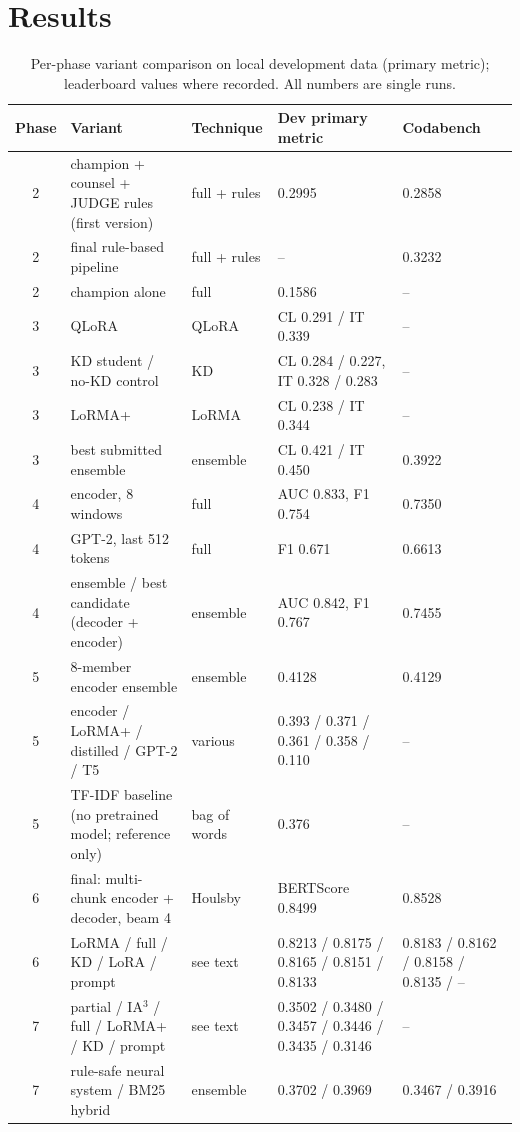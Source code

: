 \documentclass[10pt,a4paper]{article}
\begin{document}
\section{Results}
\begin{table}[h]\centering\footnotesize
\caption{Per-phase variant comparison on local development data (primary metric); leaderboard values where recorded. All numbers are single runs.}\label{tab:results}
\begin{tabular}{@{}cllll@{}}
\toprule
Phase & Variant & Technique & Dev primary metric & Codabench\\\midrule
2 & champion + counsel + JUDGE rules (first version) & full + rules & 0.2995 & 0.2858\\
2 & final rule-based pipeline & full + rules & -- & 0.3232\\
2 & champion alone & full & 0.1586 & --\\
3 & QLoRA & QLoRA & CL 0.291 / IT 0.339 & --\\
3 & KD student / no-KD control & KD & CL 0.284 / 0.227, IT 0.328 / 0.283 & --\\
3 & LoRMA+ & LoRMA & CL 0.238 / IT 0.344 & --\\
3 & best submitted ensemble & ensemble & CL 0.421 / IT 0.450 & 0.3922\\
4 & encoder, 8 windows & full & AUC 0.833, F1 0.754 & 0.7350\\
4 & GPT-2, last 512 tokens & full & F1 0.671 & 0.6613\\
4 & ensemble / best candidate (decoder + encoder) & ensemble & AUC 0.842, F1 0.767 & 0.7455\\
5 & 8-member encoder ensemble & ensemble & 0.4128 & 0.4129\\
5 & encoder / LoRMA+ / distilled / GPT-2 / T5 & various & 0.393 / 0.371 / 0.361 / 0.358 / 0.110 & --\\
5 & TF-IDF baseline (no pretrained model; reference only) & bag of words & 0.376 & --\\
6 & final: multi-chunk encoder + decoder, beam 4 & Houlsby & BERTScore 0.8499 & 0.8528\\
6 & LoRMA / full / KD / LoRA / prompt & see text & 0.8213 / 0.8175 / 0.8165 / 0.8151 / 0.8133 & 0.8183 / 0.8162 / 0.8158 / 0.8135 / --\\
7 & partial / IA$^3$ / full / LoRMA+ / KD / prompt & see text & 0.3502 / 0.3480 / 0.3457 / 0.3446 / 0.3435 / 0.3146 & --\\
7 & rule-safe neural system / BM25 hybrid & ensemble & 0.3702 / 0.3969 & 0.3467 / 0.3916\\\bottomrule
\end{tabular}
\end{table}
\end{document}

